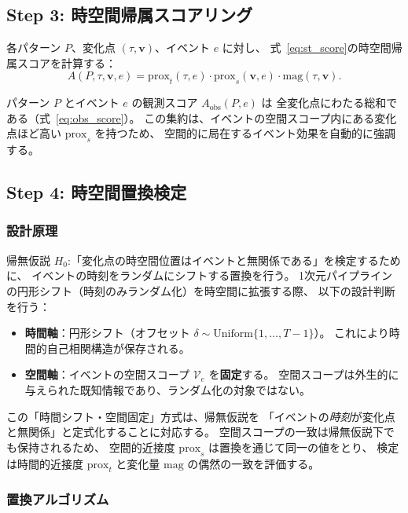 \subsection{Step 3: 時空間帰属スコアリング}

各パターン $P$、変化点 $(\tau, \mathbf{v})$、イベント $e$ に対し、
式~\eqref{eq:st_score}の時空間帰属スコアを計算する：
\[
A(P, \tau, \mathbf{v}, e) = \mathrm{prox}_t(\tau, e) \cdot \mathrm{prox}_s(\mathbf{v}, e) \cdot \mathrm{mag}(\tau, \mathbf{v}).
\]

パターン $P$ とイベント $e$ の観測スコア $A_{\mathrm{obs}}(P, e)$ は
全変化点にわたる総和である（式~\eqref{eq:obs_score}）。
この集約は、イベントの空間スコープ内にある変化点ほど高い
$\mathrm{prox}_s$ を持つため、
空間的に局在するイベント効果を自動的に強調する。

\subsection{Step 4: 時空間置換検定}\label{sec:st_permtest}

\subsubsection{設計原理}

帰無仮説 $H_0$:「変化点の時空間位置はイベントと無関係である」を検定するために、
イベントの時刻をランダムにシフトする置換を行う。
1次元パイプラインの円形シフト（時刻のみランダム化）を時空間に拡張する際、
以下の設計判断を行う：

\begin{itemize}
\item \textbf{時間軸}：円形シフト（オフセット $\delta \sim \mathrm{Uniform}\{1, \ldots, T-1\}$）。
これにより時間的自己相関構造が保存される。
\item \textbf{空間軸}：イベントの空間スコープ $\mathcal{V}_e$ を\textbf{固定}する。
空間スコープは外生的に与えられた既知情報であり、ランダム化の対象ではない。
\end{itemize}

この「時間シフト・空間固定」方式は、帰無仮説を
「イベントの\emph{時刻}が変化点と無関係」と定式化することに対応する。
空間スコープの一致は帰無仮説下でも保持されるため、
空間的近接度 $\mathrm{prox}_s$ は置換を通じて同一の値をとり、
検定は時間的近接度 $\mathrm{prox}_t$ と変化量 $\mathrm{mag}$ の偶然の一致を評価する。

\subsubsection{置換アルゴリズム}

